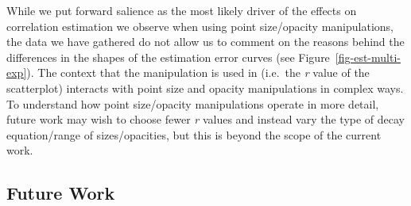 \documentclass[manuscript, review, anonymous, screen]{acmart}
\begin{document}
While we put forward salience as the most likely driver of the effects
on correlation estimation we observe when using point size/opacity
manipulations, the data we have gathered do not allow us to comment on
the reasons behind the differences in the shapes of the estimation error
curves (see Figure~\ref{fig-est-multi-exp}). The context that the
manipulation is used in (i.e.~the \emph{r} value of the scatterplot)
interacts with point size and opacity manipulations in complex ways. To
understand how point size/opacity manipulations operate in more detail,
future work may wish to choose fewer \emph{r} values and instead vary
the type of decay equation/range of sizes/opacities, but this is beyond
the scope of the current work.

\hypertarget{sec-future-work}{%
\subsection{Future Work}\label{sec-future-work}}
\end{document}
